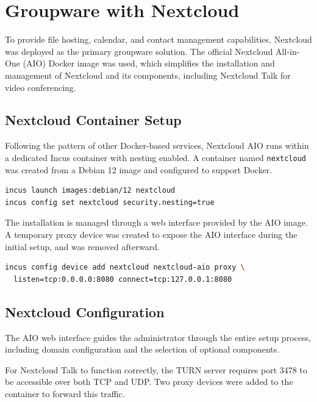 \section{Groupware with Nextcloud}

To provide file hosting, calendar, and contact management capabilities, Nextcloud was deployed as the primary groupware solution. The official Nextcloud All-in-One (AIO) Docker image\cite{nextcloud-aio} was used, which simplifies the installation and management of Nextcloud and its components, including Nextcloud Talk for video conferencing.

\subsection*{Nextcloud Container Setup}

Following the pattern of other Docker-based services, Nextcloud AIO runs within a dedicated Incus container with nesting enabled. A container named \texttt{nextcloud} was created from a Debian 12 image and configured to support Docker.

\begin{lstlisting}[language=bash,caption={Creating and configuring the Nextcloud container.}]
incus launch images:debian/12 nextcloud
incus config set nextcloud security.nesting=true
\end{lstlisting}

The installation is managed through a web interface provided by the AIO image. A temporary proxy device was created to expose the AIO interface during the initial setup, and was removed afterward.

\begin{lstlisting}[language=bash,caption={Temporarily exposing the Nextcloud AIO interface.}]
incus config device add nextcloud nextcloud-aio proxy \
  listen=tcp:0.0.0.0:8080 connect=tcp:127.0.0.1:8080
\end{lstlisting}

\subsection*{Nextcloud Configuration}

The AIO web interface guides the administrator through the entire setup process, including domain configuration and the selection of optional components.

For Nextcloud Talk to function correctly, the TURN server requires port 3478 to be accessible over both TCP and UDP. Two proxy devices were added to the container to forward this traffic.

